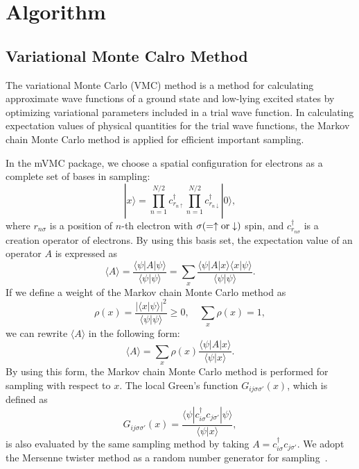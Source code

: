 \chapter{{Algorithm}}
\label{Ch:algorithm}
\section{Variational Monte Calro Method}

The variational Monte Carlo (VMC) method is a method for calculating approximate wave functions 
of a ground state and low-lying excited states by optimizing variational parameters included in a trial
wave function. 
In calculating expectation values of physical quantities for the trial wave functions,
the Markov chain Monte Carlo method is applied for efficient important sampling.

In the mVMC package, we choose a spatial configuration for electrons as a complete set of bases in sampling:
\begin{equation}
| x\rangle =  \prod_{n=1}^{N/2} c_{r_{n\uparrow}}^{\dag} \prod_{n=1}^{N/2} c_{r_{n\downarrow}}^{\dag} |0 \rangle,
\end{equation}
where $r_{n\sigma}$ is a position of $n$-th electron with $\sigma (=\uparrow \rm{or} \downarrow)$ spin,
and $c_{r_{n\sigma}}^{\dag}$ is a creation operator of electrons.
By using this basis set, the expectation value of an operator $A$ is expressed as
\begin{equation}
\langle A \rangle =\frac{\langle \psi| A| \psi \rangle}{\langle \psi | \psi \rangle} 
=\sum_x \frac{\langle \psi| A | x\rangle \langle x| \psi \rangle}{\langle \psi |\psi \rangle}.
\end{equation}
If we define a weight of the Markov chain Monte Carlo method as
\begin{equation}
\rho(x)=\frac{|\langle x| \psi \rangle|^2}{\langle \psi | \psi \rangle} \ge 0, \quad \sum_{x} \rho(x)=1,
\end{equation}
we can rewrite $\langle A \rangle$ in the following form:
\begin{equation}
\langle A \rangle =\sum_x \rho(x) \frac{\langle \psi| A | x\rangle }{\langle \psi |x \rangle}.
\end{equation}
By using this form, the Markov chain Monte Carlo method is performed for sampling
with respect to $x$. The local Green's function $G_{ij\sigma\sigma'}(x)$, which is defined as
\begin{equation}
G_{ij\sigma\sigma'}(x)=\frac{\langle \psi | c_{i\sigma}^{\dag} c_{j\sigma'} | \psi \rangle}{\langle \psi | x \rangle},
\end{equation}
is also evaluated by the same sampling method by taking $A = c_{i\sigma}^{\dag} c_{j\sigma'}$.
We adopt the Mersenne twister method as a random number generator for sampling~\cite{Mutsuo2008}. 

